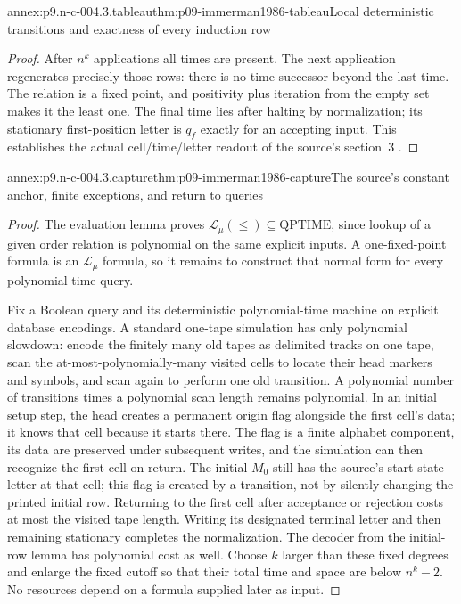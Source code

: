 \begin{annexitem}{annex:p9.n-c-004.3.tableau}{thm:p09-immerman1986-tableau}{Local deterministic transitions and exactness of every induction row}
\begin{proof}
After \(n^k\) applications all times are present.  The next application
regenerates precisely those rows: there is no time successor beyond the
last time.  The relation is a fixed point, and positivity plus iteration
from the empty set makes it the least one.  The final time lies after
halting by normalization; its stationary first-position letter is
\(q_f\) exactly for an accepting input.  This establishes the actual
cell/time/letter readout of the source's section~3 \cite[thm.~1]{Immerman1986}.
\end{proof}
\end{annexitem}

\begin{annexitem}{annex:p9.n-c-004.3.capture}{thm:p09-immerman1986-capture}{The source's constant anchor, finite exceptions, and return to queries}
\begin{proof}
The evaluation lemma proves \(\mathcal L_\mu(\leq)\subseteq
\mathrm{QPTIME}\), since lookup of a given order relation is
polynomial on the same explicit inputs.  A one-fixed-point formula is
an \(\mathcal L_\mu\) formula, so it remains to construct that
normal form for every polynomial-time query.

Fix a Boolean query and its deterministic polynomial-time machine on
explicit database encodings.  A standard one-tape simulation has only
polynomial slowdown: encode the finitely many old tapes as delimited
tracks on one tape, scan the at-most-polynomially-many visited cells
to locate their head markers and symbols, and scan again to perform
one old transition.  A polynomial number of transitions times a
polynomial scan length remains polynomial.  In an initial setup step,
the head creates a permanent origin flag alongside the first cell's
data; it knows that cell because it starts there.  The flag is a finite
alphabet component, its data are preserved under subsequent writes,
and the simulation can then recognize the first cell on return.  The
initial \(M_0\) still has the source's start-state letter at that
cell; this flag is created by a transition, not by silently changing
the printed initial row.  Returning to the first cell after acceptance
or rejection costs at most the visited tape length.
Writing its designated terminal letter and then remaining stationary
completes the normalization.  The decoder from the initial-row lemma
has polynomial cost as well.  Choose \(k\) larger than these fixed
degrees and enlarge the fixed cutoff so that their total time and space
are below \(n^k-2\).  No resources depend on a formula supplied
later as input.


\end{proof}
\end{annexitem}
